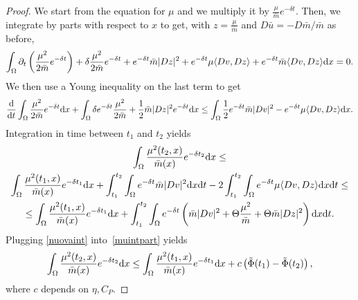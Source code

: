 \documentclass[10pt,a4paper,nouppercase,nowrite]{article}
\numberwithin{equation}{section}
\newcommand{\di}{{\rm d}}
\theoremstyle{definition}
\begin{document}
	\begin{proof}
		We start from the equation for $\mu$ and we multiply it by $\frac{\mu}{\bar{m}} e^{-\delta t}$. Then, we integrate by parts with respect to $x$ to get,
		with $z=\frac{\mu}{\bar{m}}$ and $D\bar u = -D \bar m / \bar m$ as before,
		\begin{equation*}
			\int_{\Omega} \partial_t \left( \frac{\mu^2}{2\bar{m}} e^{-\delta t}  \right) + \delta \frac{\mu^2}{2\bar{m}} e^{-\delta t} + e^{-\delta t} \bar{m} |Dz|^2 + e^{-\delta t} \mu \langle Dv,Dz \rangle + e^{-\delta t} \bar{m} \langle Dv,Dz \rangle \di x = 0.
		\end{equation*}
		We then use a Young inequality on the last term to get
		\begin{equation*}
			\frac{\di}{\di t} \int_{\Omega} \frac{\mu^2}{2\bar{m}} e^{-\delta t} \di x + \int_{\Omega} \delta e^{-\delta t}  \frac{\mu^2}{2\bar{m}} + \frac{1}{2} \bar{m} |Dz|^2 e^{-\delta t} \di x \le \int_{\Omega} \frac{1}{2} e^{-\delta t} \bar{m} |Dv|^2 - e^{-\delta t} \mu \langle Dv,Dz \rangle \di x.
		\end{equation*}
		Integration in time between $t_1$ and $t_2$ yields
		\begin{multline}
				\int_{\Omega} \frac{\mu^2(t_2,x)}{\bar{m}(x)} e^{-\delta t_2} \di x  \le \\ \int_{\Omega} \frac{\mu^2(t_1,x)}{\bar{m}(x)} e^{-\delta t_1} \di x + \int_{t_1}^{t_2} \int_{\Omega} e^{-\delta t} \bar{m}|Dv|^2 \di x \di t - 2 \int_{t_1}^{t_2} \int_{\Omega} e^{-\delta t} \mu \langle Dv,Dz \rangle \di x \di t \le \\
				 \le \int_{\Omega} \frac{\mu^2(t_1,x)}{\bar{m}(x)} e^{-\delta t_1} \di x + \int_{t_1}^{t_2} \int_{\Omega} e^{-\delta t} \left( \bar{m}|Dv|^2 + \Theta \frac{\mu^2}{\bar{m}} + \Theta \bar{m}|Dz|^2 \right) \di x \di t.
			\label{muintpart}
		\end{multline}
		Plugging \eqref{nuovaint} into~\eqref{muintpart} yields
		\begin{equation}
				\int_{\Omega} \frac{\mu^2(t_2,x)}{\bar{m}(x)} e^{-\delta t_2} \di x \le  \int_{\Omega} \frac{\mu^2(t_1,x)}{\bar{m}(x)} e^{-\delta t_1} \di x + c \left( \tilde{\Phi}(t_1)  - \tilde{\Phi}(t_2)  \right),
			\label{muintpart2}
		\end{equation}
		where $c$ depends on $\eta, C_P$. 
		

\end{proof}
\end{document}

